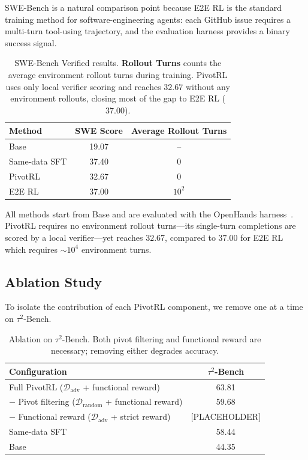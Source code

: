 SWE-Bench is a natural comparison point because E2E RL is the standard training method for software-engineering agents: each GitHub issue requires a multi-turn tool-using trajectory, and the evaluation harness provides a binary success signal.

\begin{table}[t]
\centering
\small
\begin{tabular}{lcc}
\toprule
\textbf{Method} & \textbf{SWE Score} & \textbf{Average Rollout Turns} \\
\midrule
Base             & 19.07 & -- \\
Same-data SFT    & 37.40 & 0 \\
PivotRL          & 32.67 & 0 \\
E2E RL           & 37.00 & $10^2$ \\
\bottomrule
\end{tabular}
\caption{
SWE-Bench Verified results. \textbf{Rollout Turns} counts the average environment rollout turns during training. PivotRL uses only local verifier scoring and reaches $32.67$ without any environment rollouts, closing most of the gap to E2E RL ($37.00$).
}
\label{tab:swe_e2e}
\end{table}

All methods start from Base and are evaluated with the OpenHands harness~\citep{wang2025openhandsopenplatformai}. PivotRL requires no environment rollout turns---its single-turn completions are scored by a local verifier---yet reaches $32.67$, compared to $37.00$ for E2E RL which requires ${\sim}10^4$ environment turns.

\subsection{Ablation Study}
\label{sec:ablation_study}

To isolate the contribution of each PivotRL component, we remove one at a time on $\tau^2$-Bench.

\begin{table}[t]
\centering
\small
\begin{tabular}{lc}
\toprule
\textbf{Configuration} & \textbf{$\tau^2$-Bench} \\
\midrule
Full PivotRL ($\mathcal{D}_{\mathrm{adv}}$ + functional reward) & 63.81 \\
\quad $-$ Pivot filtering ($\mathcal{D}_{\mathrm{random}}$ + functional reward) & 59.68 \\
\quad $-$ Functional reward ($\mathcal{D}_{\mathrm{adv}}$ + strict reward) & [PLACEHOLDER] \\
\midrule
Same-data SFT & 58.44 \\
Base & 44.35 \\
\bottomrule
\end{tabular}
\caption{
Ablation on $\tau^2$-Bench. Both pivot filtering and functional reward are necessary; removing either degrades accuracy.
}
\label{tab:ablation_main}
\end{table}

